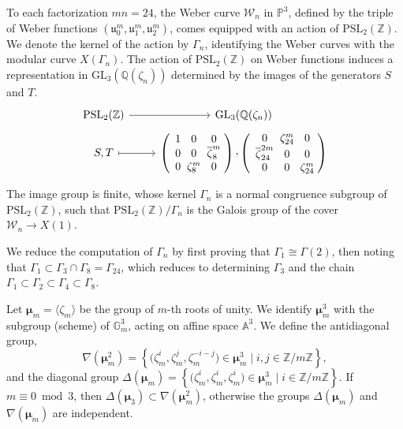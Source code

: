 \documentclass{amsart}
\newcommand{\cW}{\mathcal{W}}
\renewcommand{\AA}{\mathbb{A}}
\newcommand{\GG}{\mathbb{G}}
\newcommand{\PP}{\mathbb{P}}
\newcommand{\QQ}{\mathbb{Q}}
\newcommand{\ZZ}{\mathbb{Z}}
\newcommand{\GL}{\mathrm{GL}}
\newcommand{\PSL}{\mathrm{PSL}}
\newcommand{\isom}{\cong}
\newcommand{\uu}{\mathfrak{u}}
\newcommand{\ccomma}{\raisebox{0.4ex}{,}}
\newcommand{\mmu}{\boldsymbol{\mu}}
\begin{document}
To each factorization $mn = 24$, the Weber curve $\cW_{n}$ in $\PP^3$, defined by
the triple of Weber functions $(\uu_0^m,\uu_1^m,\uu_2^m)$, comes equipped with an
action of $\PSL_2(\ZZ)$. We denote the kernel of the action by $\Gamma_n$, identifying
the Weber curves with the modular curve $X(\Gamma_n)$.  The action of $\PSL_2(\ZZ)$
on Weber functions induces a representation in $\GL_3(\QQ(\zeta_n))$ determined by
the images of the generators $S$ and $T$.
$$
\begin{tikzcd}[row sep=1mm]
  \PSL_2(\ZZ) \arrow[r] & \GL_3(\QQ(\zeta_n)) \\
  S, T \arrow[r,mapsto] &
  \left(\begin{array}{*{5}{c@{\;}}}
    1 & 0 & 0 \\
    0 & 0 & \overline{\zeta}_{8}^{m} \\ 
    0 & \zeta_{8}^{m} & 0
  \end{array} \right)\ccomma
  \left(\begin{array}{*{5}{c@{\;}}}
    0 & \zeta_{24}^m & 0 \\
    \overline{\zeta}_{24}^{2m} & 0 & 0 \\
    0 & 0 & \zeta_{24}^m \end{array}\right)
\end{tikzcd}
$$
The image group is finite, whose kernel $\Gamma_n$ is a normal congruence subgroup
of $\PSL_2(\ZZ)$, such that $\PSL_2(\ZZ)/\Gamma_n$ is the Galois group of the cover
$\cW_n \to X(1)$.

We reduce the computation of $\Gamma_n$ by first proving that
$\Gamma_1 \isom \Gamma(2)$, then noting that $\Gamma_1 \subset \Gamma_3 \cap \Gamma_8
= \Gamma_{24}$, which reduces to determining $\Gamma_3$ and the chain
$\Gamma_1 \subset \Gamma_2 \subset \Gamma_4 \subset \Gamma_8$.

Let $\mmu_m = \langle\zeta_m\rangle$ be the group of $m$-th roots of unity. We identify
$\mmu_m^3$ with the subgroup (scheme)
of $\GG_m^3$, acting on affine space $\AA^3$.
We define the antidiagonal group,
$$
\nabla(\mmu_m^2) = \left\{
  \big(\zeta_m^i,\zeta_m^j,\zeta_m^{-i-j}\big) \in \mmu_m^3 \;|\; i,j \in \ZZ/m\ZZ \right\},
$$
and the diagonal group
$
\Delta(\mmu_m) = \left\{ \big(\zeta_m^i,\zeta_m^i,\zeta_m^i\big) \in \mmu_m^3 \;|\; i \in \ZZ/m\ZZ \right\}.
$
If $m \equiv 0 \bmod 3$, then $\Delta(\mmu_3) \subset \nabla(\mmu_m^2)$, otherwise
the groups $\Delta(\mmu_m)$ and $\nabla(\mmu_m)$ are independent.
\end{document}
